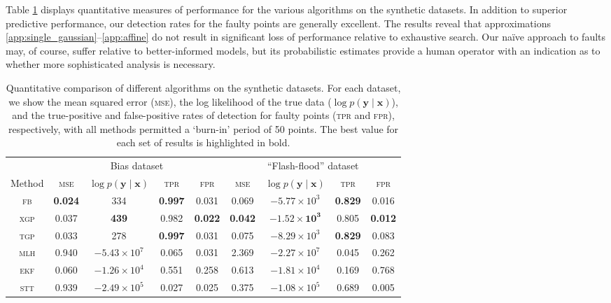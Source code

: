 \documentclass[twoside]{article}
\newcommand{\given}{\!\ensuremath{\mid}\!}
\newcommand{\bm}[1]{\ensuremath{\mathbf{#1}}}
\begin{document}
Table \ref{tbl:results} displays quantitative measures of performance
for the various algorithms on the synthetic
datasets.  
In addition to superior predictive performance, our
detection rates for the faulty points are generally excellent. The results reveal that approximations \ref{app:single_gaussian}--\ref{app:affine} do not result in significant loss of performance relative to exhaustive search. Our na\"{i}ve approach to faults may, of course, suffer relative to better-informed models, but its probabilistic estimates provide a human operator with an indication as to whether more sophisticated analysis is necessary.

\begin{table}
  \centering
  \caption{Quantitative comparison of different algorithms on the
    synthetic datasets.  For each dataset, we show the mean squared error
    (\textsc{mse}), the log likelihood of the true data ($\log p(\bm{y}
    \given \bm{x})$), and the true-positive and false-positive rates
    of detection for faulty points (\textsc{tpr} and \textsc{fpr}),
    respectively, with all methods permitted a `burn-in' period of 50 points. The best value for each set of results is highlighted in
    bold.}
  \label{tbl:results}
  \begin{tabular}{ccccccccc}
    \toprule
& \multicolumn{4}{c}{Bias dataset} & \multicolumn{4}{c}{``Flash-flood'' dataset}\\
    \cmidrule(l){2-5} \cmidrule(l){6-9}
    Method & \scshape{mse} & $\log p(\bm{y}\given\bm{x})$ & \scshape{tpr} & \scshape{fpr} 
& \scshape{mse} & $\log p(\bm{y}\given\bm{x})$ & \scshape{tpr} & \scshape{fpr} \\
\midrule
    \scshape{fb} & \textbf{0.024} & 334 & \textbf{0.997} & 0.031 & 0.069 & $-5.77\times 10^3$ & \textbf{0.829} & {0.016} \\
    \scshape{xgp} & 0.037 & \textbf{439} & 0.982 & \textbf{0.022} & \textbf{0.042} & $\mathbf{-1.52 \times 10^3}$ & 0.805 & \textbf{0.012} \\
    \scshape{tgp} & 0.033 & 278 & \textbf{0.997} & 0.031 & 0.075 & $-8.29\times 10^3$ & \textbf{0.829} & 0.083 \\
    \scshape{mlh} & 0.940 & $-5.43\times 10^7$ & 0.065 & 0.031 & 2.369 & $-2.27\times 10^7$ & 0.045 & 0.262 \\
   \scshape{ekf} & 0.060 & $-1.26 \times 10^4$ & 0.551 & 0.258 & 0.613 & $-1.81\times 10^4$ & 0.169 & 0.768 \\
   \scshape{stt} & 0.939 & $-2.49 \times 10^5$ & 0.027 & 0.025 &
		  0.375 & $-1.08 \times 10^5$ & 0.689 & 0.005\\
    \bottomrule
  \end{tabular}
\end{table}
\end{document}
